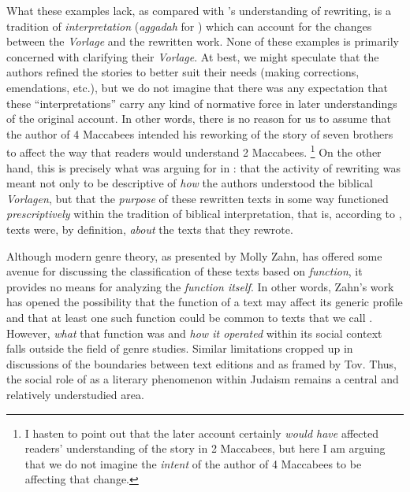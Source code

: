 What these examples lack, as compared with \vermes's understanding of rewriting, is a tradition of \emph{interpretation} (\emph{aggadah} for \vermes) which can account for the changes between the \emph{Vorlage} and the rewritten work. None of these examples is primarily concerned with clarifying their \emph{Vorlage}. At best, we might speculate that the authors refined the stories to better suit their needs (making corrections, emendations, etc.), but we do not imagine that there was any expectation that these ``interpretations'' carry any kind of normative force in later understandings of the original account. In other words, there is no reason for us to assume that the author of 4 Maccabees intended his reworking of the story of seven brothers to affect the way that readers would understand 2 Maccabees.%
    \footnote{%
        I hasten to point out that the later account certainly \emph{would have} affected readers' understanding of the story in 2 Maccabees, but here I am arguing that we do not imagine the \emph{intent} of the author of 4 Maccabees to be affecting that change.}
On the other hand, this is precisely what \vermes was arguing for in : that the activity of rewriting was meant not only to be descriptive of \emph{how} the authors understood the biblical \emph{Vorlagen}, but that the \emph{purpose} of these rewritten texts in some way functioned \emph{prescriptively} within the tradition of biblical interpretation, that is, according to \vermes, \rwb texts were, by definition, \emph{about} the texts that they rewrote. 

Although modern genre theory, as presented by Molly Zahn, has offered some avenue for discussing the classification of these texts based on \emph{function}, it provides no means for analyzing the \emph{function itself}. In other words, Zahn's work has opened the possibility that the function of a text may affect its generic profile and that at least one such function could be common to texts that we call \rwb. However, \emph{what} that function was and \emph{how it operated} within its social context falls outside the field of genre studies. Similar limitations cropped up in discussions of the boundaries between text editions and \rwb as framed by Tov. Thus, the social role of \rwb as a literary phenomenon within \secondtemple Judaism remains a central and relatively understudied area.

